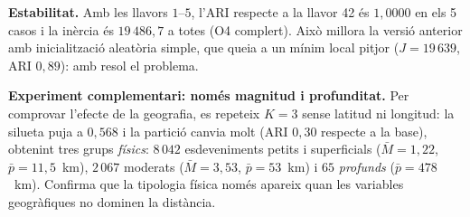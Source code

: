 \documentclass[10.5pt,a4paper]{article}
\newcommand{\py}[1]{\texttt{\detokenize{#1}}}
\begin{document}
\textbf{Estabilitat.} Amb les llavors $1$--$5$, l'ARI respecte a la llavor 42 és $1{,}0000$ en els 5 casos i la inèrcia és $19\,486{,}7$ a totes (O4 complert). Això millora la versió anterior amb inicialització aleatòria simple, que queia a un mínim local pitjor ($J=19\,639$, ARI $0{,}89$): \py{k-means++} amb \py{n_init=10} resol el problema.

\textbf{Experiment complementari: només magnitud i profunditat.} Per comprovar l'efecte de la geografia, es repeteix $K=3$ sense latitud ni longitud: la silueta puja a $0{,}568$ i la partició canvia molt (ARI $0{,}30$ respecte a la base), obtenint tres grups \emph{físics}: $8\,042$ esdeveniments petits i superficials ($\bar M=1{,}22$, $\bar p=11{,}5$~km), $2\,067$ moderats ($\bar M=3{,}53$, $\bar p=53$~km) i $65$ \emph{profunds} ($\bar p=478$~km). Confirma que la tipologia física només apareix quan les variables geogràfiques no dominen la distància.
\end{document}
